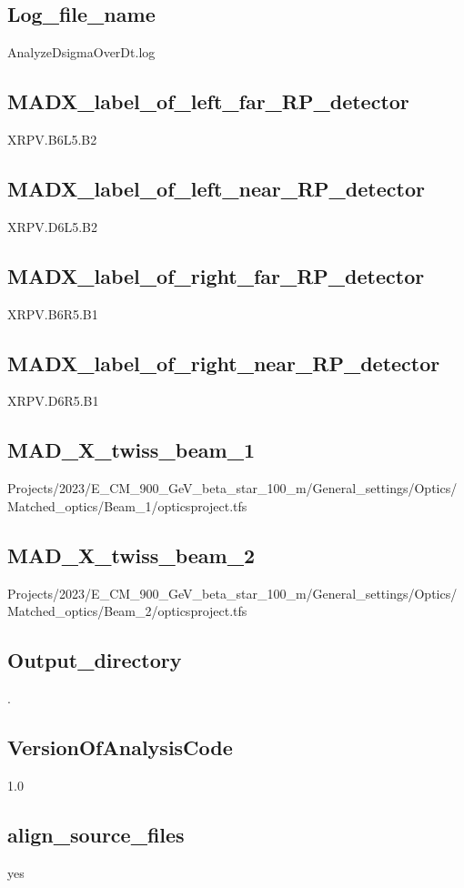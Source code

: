 \documentclass{article}
\begin{document}
\begin{landscape}
\subsection{Log\_file\_name}
AnalyzeDsigmaOverDt.log \newline
\subsection{MADX\_label\_of\_left\_far\_RP\_detector}
XRPV.B6L5.B2 \newline
\subsection{MADX\_label\_of\_left\_near\_RP\_detector}
XRPV.D6L5.B2 \newline
\subsection{MADX\_label\_of\_right\_far\_RP\_detector}
XRPV.B6R5.B1 \newline
\subsection{MADX\_label\_of\_right\_near\_RP\_detector}
XRPV.D6R5.B1 \newline
\subsection{MAD\_X\_twiss\_beam\_1}
Projects/2023/E\_CM\_900\_GeV\_beta\_star\_100\_m/General\_settings/Optics/Matched\_optics/Beam\_1/opticsproject.tfs \newline
\subsection{MAD\_X\_twiss\_beam\_2}
Projects/2023/E\_CM\_900\_GeV\_beta\_star\_100\_m/General\_settings/Optics/Matched\_optics/Beam\_2/opticsproject.tfs \newline
\subsection{Output\_directory}
. \newline
\subsection{VersionOfAnalysisCode}
1.0 \newline
\subsection{align\_source\_files}
yes \newline

\end{landscape}
\end{document}
